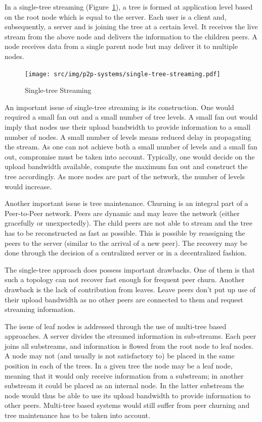 In a single-tree streaming
(Figure~\ref{fig:p2p-systems:single-tree-streaming}), a tree is formed at
application level based on the root node which is equal to the server. Each
user is a client and, subsequently, a server and is joining the tree at a
certain level. It receives the live stream from the above node and delivers
the information to the children peers. A node receives data from a single
parent node but may deliver it to multiple nodes.

\begin{figure}
  \centering
  \texttt{[image: src/img/p2p-systems/single-tree-streaming.pdf]}
  \caption{Single-tree Streaming}
  \label{fig:p2p-systems:single-tree-streaming}
\end{figure}

An important issue of single-tree streaming is its construction. One would
required a small fan out and a small number of tree levels. A small fan out
would imply that nodes use their upload bandwidth to provide information to a
small number of nodes. A small number of levels means reduced delay in
propagating the stream. As one can not achieve both a small number of
levels and a small fan out, compromise must be taken into account. Typically,
one would decide on the upload bandwidth available, compute the maximum fan
out and construct the tree accordingly. As more nodes are part of the network,
the number of levels would increase.

Another important issue is tree maintenance. Churning is an integral part of
a Peer-to-Peer network. Peers are dynamic and may leave the network (either
gracefully or unexpectedly). The child peers are not able to stream and the
tree has to be reconstructed as fast as possible. This is possible by
reassigning the peers to the server (similar to the arrival of a new peer).
The recovery may be done through the decision of a centralized server or in a
decentralized fashion.

The single-tree approach does possess important drawbacks. One of them is that
such a topology can not recover fast enough for frequent peer churn. Another
drawback is the lack of contribution from leaves. Leave peers don't put up use
of their upload bandwidth as no other peers are connected to them and request
streaming information.

The issue of leaf nodes is addressed through the use of multi-tree based
approaches. A server divides the streamed information in sub-streams. Each
peer joins all substreams, and information is flowed from the root node to
leaf nodes. A node may not (and usually is not satisfactory to) be placed in the
same position in each of the trees. In a given tree the node may be a leaf
node, meaning that it would only receive information from a substream; in
another substream it could be placed as an internal node. In the latter
substream the node would thus be able to use its upload bandwidth to provide
information to other peers. Multi-tree based systems would still suffer from
peer churning and tree maintenance has to be taken into account.

